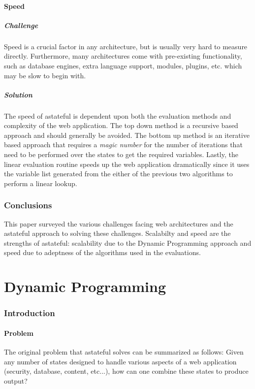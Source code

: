 \documentclass[11pt,twocolumn]{article}
\begin{document}
\subsection{Speed}
\subsubsection{Challenge}
Speed is a crucial factor in any architecture, but is usually very hard to measure directly. Furthermore, many architectures come with pre-existing functionality, such as database engines, extra language support, modules, plugins, etc. which may be slow to begin with.
\subsubsection{Solution}
The speed of astateful is dependent upon both the evaluation methods and complexity of the web application. The top down method is a recursive based approach and should generally be avoided. The bottom up method is an iterative based approach that requires a \emph{magic number} for the number of iterations that need to be performed over the states to get the required variables. Lastly, the linear evaluation routine speeds up the web application dramatically since it uses the variable list generated from the either of the previous two algorithms to perform a linear lookup.
\section{Conclusions}
This paper surveyed the various challenges facing web architectures and the astateful approach to solving these challenges. Scalabilty and speed are the strengths of astateful: scalability due to the Dynamic Programming approach and speed due to adeptness of the algorithms used in the evaluations.

\newpage
\part{Dynamic Programming}
\section{Introduction}
\subsection{Problem}
The original problem that astateful solves can be summarized as follows: Given any number of states designed to handle various aspects of a web application (security, database, content, etc...), how can one combine these states to produce output?
\end{document}
